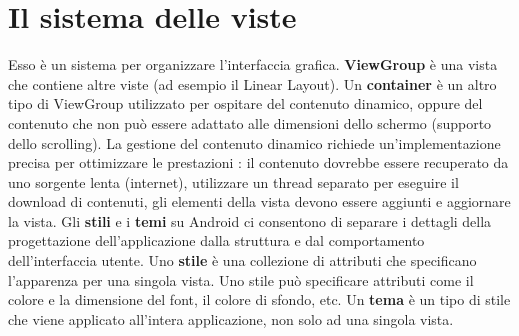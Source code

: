 \documentclass[12pt]{report}
\begin{document}
\section{Il sistema delle viste}
Esso è un sistema per organizzare l'interfaccia grafica. \textbf{ViewGroup} è una vista che contiene altre viste (ad esempio il Linear Layout). Un \textbf{container} è un altro tipo di ViewGroup utilizzato per ospitare del contenuto dinamico, oppure del contenuto che non può essere adattato alle dimensioni dello schermo (supporto dello scrolling). La gestione del contenuto dinamico richiede un'implementazione precisa per ottimizzare le prestazioni : il contenuto dovrebbe essere recuperato da uno sorgente lenta (internet), utilizzare un thread separato per eseguire il download di contenuti, gli elementi della vista devono essere aggiunti e aggiornare la vista. Gli \textbf{stili} e i \textbf{temi} su Android ci consentono di separare i dettagli della progettazione dell'applicazione dalla struttura e dal comportamento dell'interfaccia utente. Uno \textbf{stile} è una collezione di attributi che specificano l'apparenza per una singola vista. Uno stile può specificare attributi come il colore e la dimensione del font, il colore di sfondo, etc. Un \textbf{tema} è un tipo di stile che viene applicato all'intera applicazione, non solo ad una singola vista.
\end{document}
